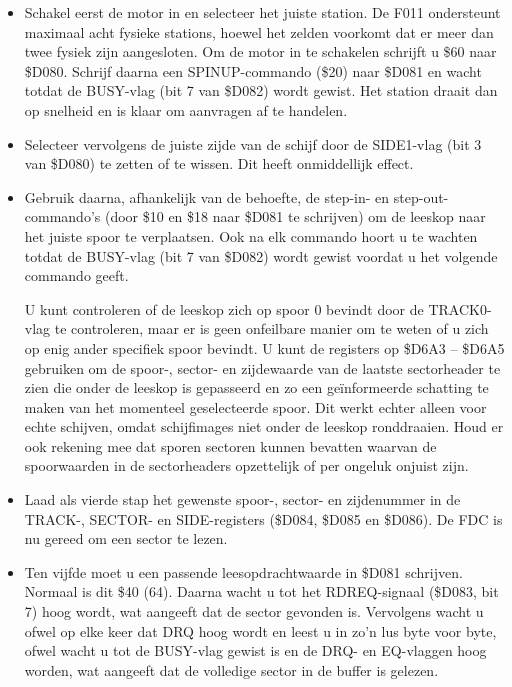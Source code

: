 \begin{itemize}
\item Schakel eerst de motor in en selecteer het juiste station. De F011 ondersteunt maximaal acht fysieke stations, hoewel het zelden voorkomt dat er meer dan twee fysiek zijn aangesloten. Om de motor in te schakelen schrijft u \$60 naar \$D080. Schrijf daarna een SPINUP-commando (\$20) naar \$D081 en wacht totdat de BUSY-vlag (bit 7 van \$D082) wordt gewist. Het station draait dan op snelheid en is klaar om aanvragen af te handelen.\item Selecteer vervolgens de juiste zijde van de schijf door de SIDE1-vlag (bit 3 van \$D080) te zetten of te wissen. Dit heeft onmiddellijk effect.\item Gebruik daarna, afhankelijk van de behoefte, de step-in- en step-out-commando's (door \$10 en \$18 naar \$D081 te schrijven) om de leeskop naar het juiste spoor te verplaatsen. Ook na elk commando hoort u te wachten totdat de BUSY-vlag (bit 7 van \$D082) wordt gewist voordat u het volgende commando geeft.

U kunt controleren of de leeskop zich op spoor 0 bevindt door de TRACK0-vlag te controleren, maar er is geen onfeilbare manier om te weten of u zich op enig ander specifiek spoor bevindt. U kunt de registers op \$D6A3 -- \$D6A5 gebruiken om de spoor-, sector- en zijdewaarde van de laatste sectorheader te zien die onder de leeskop is gepasseerd en zo een geïnformeerde schatting te maken van het momenteel geselecteerde spoor. Dit werkt echter alleen voor echte schijven, omdat schijfimages niet onder de leeskop ronddraaien. Houd er ook rekening mee dat sporen sectoren kunnen bevatten waarvan de spoorwaarden in de sectorheaders opzettelijk of per ongeluk onjuist zijn.

\item Laad als vierde stap het gewenste spoor-, sector- en zijdenummer in de TRACK-, SECTOR- en SIDE-registers (\$D084, \$D085 en \$D086). De FDC is nu gereed om een sector te lezen.

\item Ten vijfde moet u een passende leesopdrachtwaarde in \$D081 schrijven. Normaal is dit \$40 (64). Daarna wacht u tot het RDREQ-signaal (\$D083, bit 7) hoog wordt, wat aangeeft dat de sector gevonden is. Vervolgens wacht u ofwel op elke keer dat DRQ hoog wordt en leest u in zo'n lus byte voor byte, ofwel wacht u tot de BUSY-vlag gewist is en de DRQ- en EQ-vlaggen hoog worden, wat aangeeft dat de volledige sector in de buffer is gelezen.

\end{itemize}

